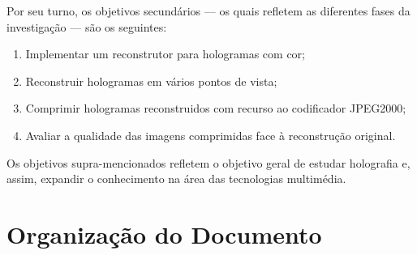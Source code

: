 Por seu turno, os objetivos secundários --- os quais refletem as diferentes fases da investigação --- são os seguintes:

\begin{enumerate}
  \item Implementar um reconstrutor para hologramas com cor;
  \item Reconstruir hologramas em vários pontos de vista;
  \item Comprimir hologramas reconstruidos com recurso ao codificador JPEG2000;
  \item Avaliar a qualidade das imagens comprimidas face à reconstrução original.
\end{enumerate}

Os objetivos supra-mencionados refletem o objetivo geral de estudar holografia e, assim, expandir o conhecimento na área das tecnologias multimédia.


\section{Organização do Documento}
\label{sec:organ}
